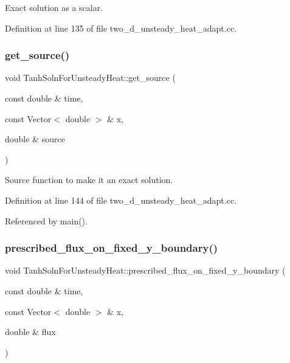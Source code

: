 Exact solution as a scalar. 



Definition at line 135 of file two\+\_\+d\+\_\+unsteady\+\_\+heat\+\_\+adapt.\+cc.

\mbox{\label{namespaceTanhSolnForUnsteadyHeat_aea922a29dfeeb80ef4768def0d6fbde4}} 
\subsubsection{\texorpdfstring{get\+\_\+source()}{get\_source()}}
{\footnotesize\ttfamily void Tanh\+Soln\+For\+Unsteady\+Heat\+::get\+\_\+source (\begin{DoxyParamCaption}\item[{const double \&}]{time,  }\item[{const Vector$<$ double $>$ \&}]{x,  }\item[{double \&}]{source }\end{DoxyParamCaption})}



Source function to make it an exact solution. 



Definition at line 144 of file two\+\_\+d\+\_\+unsteady\+\_\+heat\+\_\+adapt.\+cc.



Referenced by main().

\mbox{\label{namespaceTanhSolnForUnsteadyHeat_af4d78d73bd9981a5a9ecacecfd0e9cb8}} 
\subsubsection{\texorpdfstring{prescribed\+\_\+flux\+\_\+on\+\_\+fixed\+\_\+y\+\_\+boundary()}{prescribed\_flux\_on\_fixed\_y\_boundary()}}
{\footnotesize\ttfamily void Tanh\+Soln\+For\+Unsteady\+Heat\+::prescribed\+\_\+flux\+\_\+on\+\_\+fixed\+\_\+y\+\_\+boundary (\begin{DoxyParamCaption}\item[{const double \&}]{time,  }\item[{const Vector$<$ double $>$ \&}]{x,  }\item[{double \&}]{flux }\end{DoxyParamCaption})}



